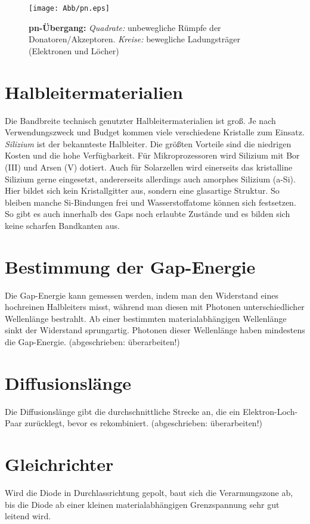 \begin{figure}[htb]
	\centering
	\texttt{[image: Abb/pn.eps]}
	\caption{\textbf{pn-Übergang:} \emph{Quadrate:} unbewegliche Rümpfe der Donatoren/Akzeptoren. \emph{Kreise:} bewegliche Ladungsträger (Elektronen und Löcher)}
	\label{pn}
\end{figure}

\section*{Halbleitermaterialien}
Die Bandbreite technisch genutzter Halbleitermaterialien ist groß. Je nach Verwendungszweck und Budget kommen viele verschiedene Kristalle zum Einsatz.\\
\emph{Silizium} ist der bekannteste Halbleiter. Die größten Vorteile sind die niedrigen Kosten und die hohe Verfügbarkeit. Für Mikroprozessoren wird Silizium mit Bor (III) und Arsen (V) dotiert. Auch für Solarzellen wird einerseits das kristalline Silizium gerne eingesetzt, andererseits allerdings auch amorphes Silizium (a-Si). Hier bildet sich kein Kristallgitter aus, sondern eine glasartige Struktur. So bleiben manche Si-Bindungen frei und Wasserstoffatome können sich festsetzen. So gibt es auch innerhalb des Gaps noch erlaubte Zustände und es bilden sich keine scharfen Bandkanten aus. 


\section*{Bestimmung der Gap-Energie}
Die Gap-Energie kann gemessen werden, indem man den Widerstand eines hochreinen Halbleiters misst, während man diesen mit Photonen unterschiedlicher Wellenlänge bestrahlt. Ab einer bestimmten materialabhängigen Wellenlänge sinkt der Widerstand sprungartig. Photonen dieser Wellenlänge haben mindestens die Gap-Energie.
(abgeschrieben: überarbeiten!)

\section*{Diffusionslänge}
Die Diffusionslänge gibt die durchschnittliche Strecke an, die ein Elektron-Loch-Paar zurücklegt, bevor es rekombiniert. (abgeschrieben: überarbeiten!)

\section*{Gleichrichter}
Wird die Diode in Durchlassrichtung gepolt, baut sich die Verarmungszone ab, bis die Diode ab einer kleinen materialabhängigen Grenzspannung sehr gut leitend wird.

